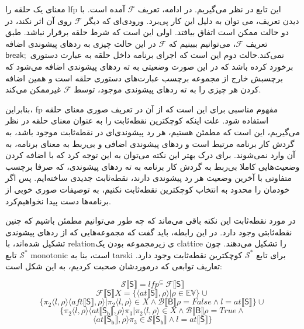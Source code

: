 \begin{defn}
	معنای یک حلقه را \gls{lfp} این تابع در نظر می‌گیریم. در ادامه، تعریف $\mathcal{F} $ آمده است. با دیدن تعریف، می توان به دلیل این کار پی‌برد. ورودی‌ای که دیگر $\mathcal{F} $ روی آن اثر نکند، در دو حالت ممکن است اتفاق بیافتد. اولی این است که شرط حلقه برقرار نباشد. طبق تعریف $\mathcal{F} $،  می‌توانیم ببینیم که $\mathcal{F} $  در این حالت چیزی به ردهای پیشوندی اضافه نمی‌کند.حالت دوم این است که اجرای برنامه داخل حلقه به عبارت‌ دستوری $\mathsf{break;}$ برخورد کرده باشد که در این صورت وضعیتی به ته ردهای پیشوندی اضافه می‌شود که برچسبش خارج از مجموعه برچسب عبارت‌های دستوری حلقه است و همین اضافه کردن هر چیزی را به ته ردهای پیشوندی موجود، توسط $\mathcal{F} $  غیرممکن می‌کند. 
	
	بنابراین، \gls{fp} مفهوم مناسبی برای این است که از آن در تعریف صوری معنای حلقه استفاده شود. علت اینکه کوچکترین نقطه‌ثابت را به عنوان معنای حلقه در نظر می‌گیریم، این است که مطمئن هستیم، هر رد پیشوندی‌ای در نقطه‌ثابت موجود باشد، به گردش کار برنامه مرتبط است و ردهای پیشوندی اضافی و بی‌ربط به معنای برنامه، به آن وارد نمی‌شوند. برای درک بهتر این نکته می‌توان به این توجه کرد که با اضافه کردن وضعیت‌هایی کاملا بی‌ربط به گردش کار برنامه به ته رد‌های پیشوندی، که صرفا برچسب متفاوتی با آخرین وضعیت هر رد پیشوندی دارند، نقطه‌ثابت جدیدی ساخته‌ایم. پس اگر خودمان را محدود به انتخاب کوچکترین نقطه‌ثابت نکنیم، به توصیفات صوری خوبی از برنامه‌ها دست پیدا نخواهیم‌کرد. 
	
	در مورد نقطه‌ثابت این نکته باقی می‌ماند که چه‌ طور می‌توانیم مطمئن باشیم که چنین نقطه‌ثابتی وجود دارد. در این رابطه، باید گفت که مجموعه‌هایی که از ردهای پیشوندی تشکیل شده‌اند، با \gls*{relation}‌ی زیرمجموعه بودن یک \gls*{clattice} را تشکیل می‌دهند. چون تابع $\mathcal{S}^*$ \gls*{monotonic} است، بنا به \gls{tarski}\cite{tarski} برای تابع $\mathcal{S}^*$ کوچکترین نقطه‌ثابت وجود دارد.
	تعاریف توابعی که درموردشان صحبت کردیم، به این شکل است:
	
	$$\mathcal{S} \llbracket\mathsf{S}\rrbracket = lfp^{\subseteq}\: \mathcal{F\llbracket\mathsf{S}\rrbracket}      $$ $$\mathcal{F} \llbracket\mathsf{S}\rrbracket X= \{ \langle at\llbracket\mathsf{S}\rrbracket , \rho \rangle | \rho \in \mathbb{EV}       \} \cup $$
	$$  \{ \pi_2 \langle l ,\rho \rangle \langle aft\llbracket\mathsf{S}\rrbracket,\rho \rangle |  \pi_2 \langle l ,\rho \rangle \in X \wedge \mathcal{B}\llbracket\mathsf{B}\rrbracket\rho=False \wedge l= at\llbracket\mathsf{S}\rrbracket   \} \cup      $$
	$$  \{ \pi_2 \langle l ,\rho \rangle \langle at\llbracket\mathsf{S_b}\rrbracket,\rho \rangle \pi_3 |  \pi_2 \langle l ,\rho \rangle \in X \wedge \mathcal{B}\llbracket\mathsf{B}\rrbracket\rho=True \wedge$$$$  \langle at\llbracket\mathsf{S_b}\rrbracket,\rho \rangle \pi_3 \in  \mathcal{S} \llbracket\mathsf{S_b}\rrbracket   \wedge   l= at\llbracket\mathsf{S}\rrbracket  \}  $$\\
	

\end{defn}

